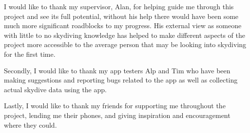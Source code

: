 \begin{acknowledgements}
  I would like to thank my supervisor, Alan, for helping guide me through this project and see its full potential, without his help there would have been some much more significant roadblocks to my progress. His external view as someone with little to no skydiving knowledge has helped to make different aspects of the project more accessible to the average person that may be looking into skydiving for the first time.

  Secondly, I would like to thank my app testers Alp and Tim who have been making suggestions and reporting bugs related to the app as well as collecting actual skydive data using the app.

  Lastly, I would like to thank my friends for supporting me throughout the project, lending me their phones, and giving inspiration and encouragement where they could.
\end{acknowledgements}
